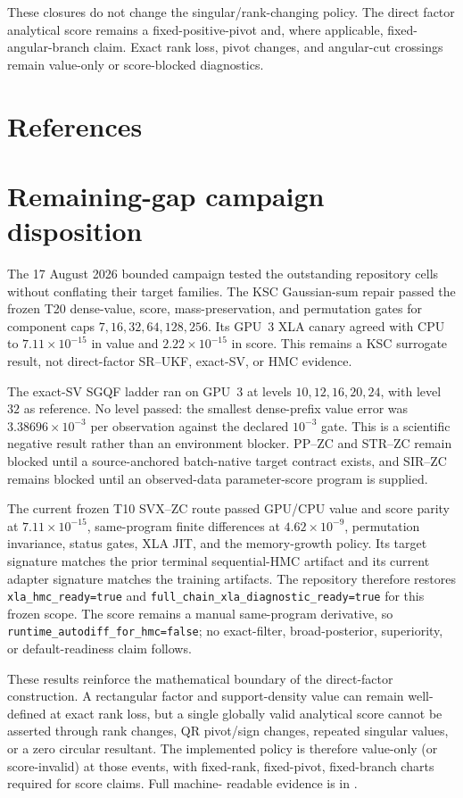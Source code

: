 \documentclass[11pt]{article}
\begin{document}
These closures do not change the singular/rank-changing policy. The direct
factor analytical score remains a fixed-positive-pivot and, where applicable,
fixed-angular-branch claim. Exact rank loss, pivot changes, and angular-cut
crossings remain value-only or score-blocked diagnostics.

\section{References}

\section{Remaining-gap campaign disposition}

The 17 August 2026 bounded campaign tested the outstanding repository cells
without conflating their target families. The KSC Gaussian-sum repair passed
the frozen T20 dense-value, score, mass-preservation, and permutation gates for
component caps $7,16,32,64,128,256$. Its GPU~3 XLA canary agreed with CPU to
$7.11\times10^{-15}$ in value and $2.22\times10^{-15}$ in score. This remains
a KSC surrogate result, not direct-factor SR--UKF, exact-SV, or HMC evidence.

The exact-SV SGQF ladder ran on GPU~3 at levels $10,12,16,20,24$, with level
$32$ as reference. No level passed: the smallest dense-prefix value error was
$3.38696\times10^{-3}$ per observation against the declared $10^{-3}$ gate.
This is a scientific negative result rather than an environment blocker.
PP--ZC and STR--ZC remain blocked until a source-anchored batch-native target
contract exists, and SIR--ZC remains blocked until an observed-data
parameter-score program is supplied.

The current frozen T10 SVX--ZC route passed GPU/CPU value and score parity at
$7.11\times10^{-15}$, same-program finite differences at
$4.62\times10^{-9}$, permutation invariance, status gates, XLA JIT, and the
memory-growth policy. Its target signature matches the prior terminal
sequential-HMC artifact and its current adapter signature matches the training
artifacts. The repository therefore restores
\texttt{xla\_hmc\_ready=true} and
\texttt{full\_chain\_xla\_diagnostic\_ready=true} for this frozen scope.
The score remains a manual same-program derivative, so
\texttt{runtime\_autodiff\_for\_hmc=false}; no exact-filter, broad-posterior,
superiority, or default-readiness claim follows.

These results reinforce the mathematical boundary of the direct-factor
construction.  A rectangular factor and support-density value can remain
well-defined at exact rank loss, but a single globally valid analytical score
cannot be asserted through rank changes, QR pivot/sign changes, repeated
singular values, or a zero circular resultant.  The implemented policy is
therefore value-only (or score-invalid) at those events, with fixed-rank,
fixed-pivot, fixed-branch charts required for score claims.  Full machine-
readable evidence is in
.
\end{document}
